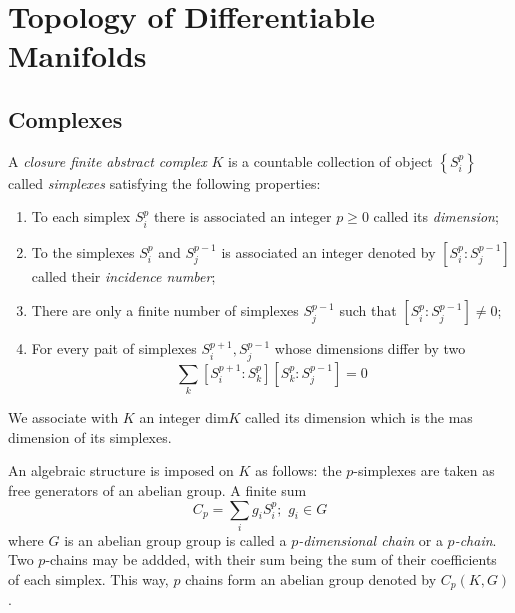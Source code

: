 \section{Topology of Differentiable Manifolds}
\subsection{Complexes}
\begin{defn}

	A \textit{closure finite abstract complex} $K$ is a countable collection of object $ \left\{ S^p_i \right\}$ called \textit{simplexes} satisfying the following properties:
	\begin{enumerate}
		\item To each simplex $S^p_i$ there is associated an integer $p \geq 0$ called its \textit{dimension};
		\item To the simplexes $S^p_i$ and $S^{ p-1 }_j$ is associated an integer denoted by $ \left[ S^p_i : S^{ p-1 }_j \right]$ called their \textit{incidence number};
		\item There are only a finite number of simplexes $ S^{ p-1 }_j$ such that $ \left[ S^p_i : S^{ p-1 }_j \right] \neq 0$;
		\item For every pait of simplexes $S^{ p+1 }_i, S^{ p-1 }_j$ whose dimensions differ by two
			\[
			\sum_k \left[ S^{ p+1 }_i : S^p_k \right] \left[ S^p_k : S^{ p-1 }_j \right] = 0
			\]
			
	\end{enumerate}
	We associate with $K$ an integer $ \mathrm{dim}K$ called its dimension which is the mas dimension of its simplexes.

\end{defn}

\begin{defn}

	An algebraic structure is imposed on $K$ as follows: the $p$-simplexes are taken as free generators of an abelian group. A finite sum
	\[
		C_p = \sum_i g_i S^p_i; \hspace{4pt} g_i \in G
	\]
	where $G$ is an abelian group group is called a \textit{$p$-dimensional chain} or a \textit{$p$-chain}. Two $p$-chains may be addded, with their sum being the sum of their coefficients of each simplex. This way, $p$ chains form an abelian group denoted by $ C_p(K,G)$.

\end{defn}

